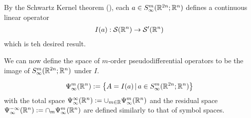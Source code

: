 \documentclass[12pt]{article}
\begin{document}
By the Schwartz Kernel theorem (\cite{}), each $a \in S^{m}_\infty({\mathbb R}^{2n}; {\mathbb R}^n)$ defines a continuous linear operator 
\begin{align*}
I(a) : \mathcal{S}({\mathbb R}^n) \to \mathcal{S}'({\mathbb R}^n)
\end{align*}
which is teh desired result. 


We can now define the space of $m$-order pseudodifferential operators to be the image of $S^{m}_{\infty}({\mathbb R}^{2n}; {\mathbb R}^{n})$ under $I$. 

\begin{fdefinition}
    \begin{align*}
    \Psi^{m}_\infty({\mathbb R}^n) := \left\{A = I(a) \, | \, a \in S^{m}_\infty({\mathbb R}^{2n}; {\mathbb R}^n)\right\}
    \end{align*}
    with the total space $\Psi^{\infty}_\infty({\mathbb R}^n) := \cup_{m \in {\ensuremath {\mathbb R}}} \Psi^m_\infty({\mathbb R}^n)$ and the residual space $\Psi^{-\infty}_\infty({\mathbb R}^n) := \cap_m \Psi^m_\infty({\mathbb R}^n)$ are defined similarly to that of symbol spaces. 
\end{fdefinition} 
\end{document}
